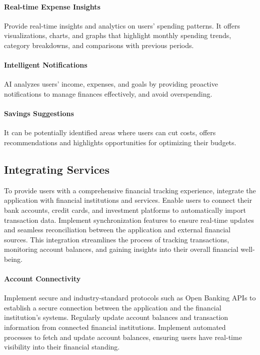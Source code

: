 \paragraph{Real-time Expense Insights}
Provide real-time insights and analytics on users' spending patterns. It offers visualizations, charts, and graphs that 
highlight monthly spending trends, category breakdowns, and comparisons with previous periods.

\paragraph{Intelligent Notifications}
AI analyzes users' income, expenses, and goals by providing proactive notifications to manage finances effectively, and 
avoid overspending.

\paragraph{Savings Suggestions}
It can be potentially identified areas where users can cut costs, offers recommendations and highlights opportunities 
for optimizing their budgets.


\subsection{Integrating Services}

To provide users with a comprehensive financial tracking experience, integrate the application with financial 
institutions and services. Enable users to connect their bank accounts, credit cards, and investment platforms 
to automatically import transaction data. Implement synchronization features to ensure real-time updates and 
seamless reconciliation between the application and external financial sources. This integration streamlines 
the process of tracking transactions, monitoring account balances, and gaining insights into their overall financial 
well-being.

\paragraph{Account Connectivity}
Implement secure and industry-standard protocols such as Open Banking APIs to establish a secure connection between 
the application and the financial institution's systems. Regularly update account balances and transaction information 
from connected financial institutions. Implement automated processes to fetch and update account balances, ensuring 
users have real-time visibility into their financial standing.

